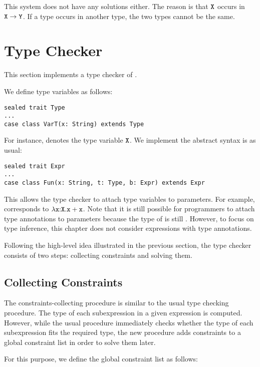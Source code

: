 This system does not have any solutions either. The reason is that $\texttt{X}$ occurs
in $\texttt{X}\rightarrow\texttt{Y}$. If a type occurs in another type, the two types cannot
be the same.

\section{Type Checker}

This section implements a type checker of \Lang.

We define type variables as follows:

\begin{verbatim}
sealed trait Type
...
case class VarT(x: String) extends Type
\end{verbatim}

For instance,  denotes the type variable $\texttt{X}$.
We implement the abstract syntax is as usual:

\begin{verbatim}
sealed trait Expr
...
case class Fun(x: String, t: Type, b: Expr) extends Expr
\end{verbatim}

This allows the type checker to attach type variables to parameters.  For
example,  corresponds to
$\lambda\texttt{x}{:}\texttt{X}.\texttt{x}+\texttt{x}$. Note that it is still possible for
programmers to attach type annotations to parameters because the type of
 is still . However, to focus on type inference, this chapter
does not consider expressions with type annotations.

Following the high-level idea illustrated in the previous section, the type
checker consists of two steps: collecting constraints and solving them.

\subsection{Collecting Constraints}

The constraints-collecting procedure is similar to the usual type checking
procedure. The type of each subexpression in a given expression is computed.
However, while the usual procedure immediately checks whether the type of each
subexpression fits the required type, the new procedure adds constraints to a
global constraint list in order to solve them later.

For this purpose, we define the global constraint list as follows:

